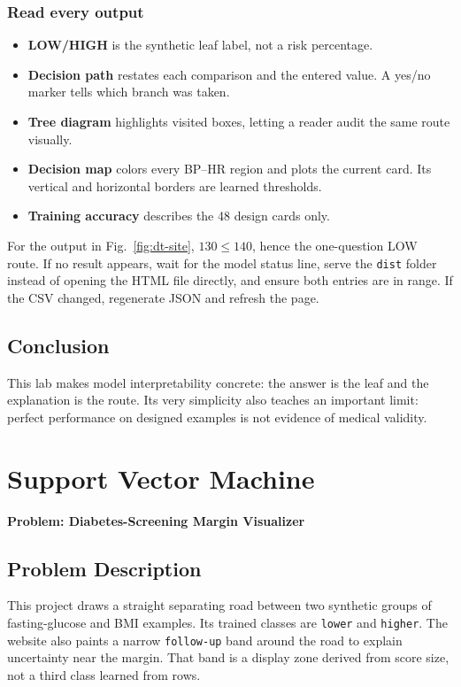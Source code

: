 \documentclass[12pt,a4paper,openany]{report}
\newcommand{\problemname}[1]{%
  \begin{center}
    {\Large\color{blue}\textbf{Problem: #1}}
  \end{center}
  \vspace{0.5em}
}
\begin{document}
\subsection{Read every output}
\begin{itemize}
  \item \textbf{LOW/HIGH} is the synthetic leaf label, not a risk percentage.
  \item \textbf{Decision path} restates each comparison and the entered value.
  A yes/no marker tells which branch was taken.
  \item \textbf{Tree diagram} highlights visited boxes, letting a reader audit
  the same route visually.
  \item \textbf{Decision map} colors every BP--HR region and plots the current
  card. Its vertical and horizontal borders are learned thresholds.
  \item \textbf{Training accuracy} describes the 48 design cards only.
\end{itemize}
For the output in Fig.~\ref{fig:dt-site}, $130\le140$, hence the one-question
LOW route. If no result appears, wait for the model status line, serve the \texttt{dist} folder
instead of opening the HTML file directly, and ensure both entries are in
range. If the CSV changed, regenerate JSON and refresh the page.

\section{Conclusion}
This lab makes model interpretability concrete: the answer is the leaf and the
explanation is the route. Its very simplicity also teaches an important limit:
perfect performance on designed examples is not evidence of medical validity.

\chapter{Support Vector Machine}
\problemname{Diabetes-Screening Margin Visualizer}

\section{Problem Description}
This project draws a straight separating road between two synthetic groups of
fasting-glucose and BMI examples. Its trained classes are \texttt{lower} and
\texttt{higher}. The website also paints a narrow \texttt{follow-up} band
around the road to explain uncertainty near the margin. That band is a display
zone derived from score size, not a third class learned from rows.
\end{document}
